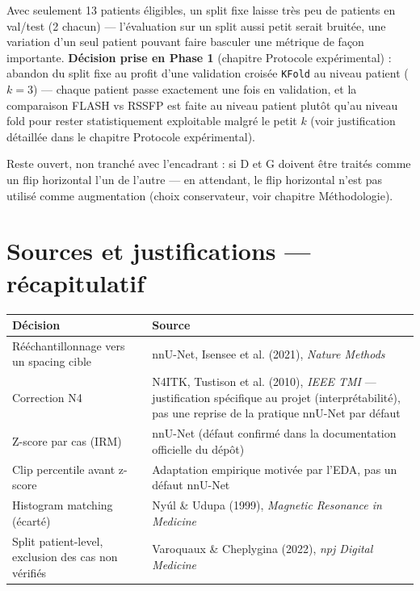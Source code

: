 Avec seulement 13 patients éligibles, un split fixe laisse très peu de patients en
val/test (2 chacun) --- l'évaluation sur un split aussi petit serait bruitée, une
variation d'un seul patient pouvant faire basculer une métrique de façon importante.
\textbf{Décision prise en Phase 1} (chapitre Protocole expérimental) : abandon du
split fixe au profit d'une validation croisée \texttt{KFold} au niveau patient
($k=3$) --- chaque patient passe exactement une fois en validation, et la comparaison
FLASH vs RSSFP est faite au niveau patient plutôt qu'au niveau fold pour rester
statistiquement exploitable malgré le petit $k$ (voir justification détaillée dans
le chapitre Protocole expérimental).

Reste ouvert, non tranché avec l'encadrant : si D et G doivent être traités comme un
flip horizontal l'un de l'autre --- en attendant, le flip horizontal n'est pas utilisé
comme augmentation (choix conservateur, voir chapitre Méthodologie).

\section{Sources et justifications --- récapitulatif}

\begin{center}
\begin{tabular}{lp{9cm}}
\toprule
Décision & Source \\
\midrule
Rééchantillonnage vers un spacing cible & nnU-Net, Isensee et al. (2021), \emph{Nature Methods} \\
Correction N4 & N4ITK, Tustison et al. (2010), \emph{IEEE TMI} --- justification spécifique au projet (interprétabilité), pas une reprise de la pratique nnU-Net par défaut \\
Z-score par cas (IRM) & nnU-Net (défaut confirmé dans la documentation officielle du dépôt) \\
Clip percentile avant z-score & Adaptation empirique motivée par l'EDA, pas un défaut nnU-Net \\
Histogram matching (écarté) & Nyúl \& Udupa (1999), \emph{Magnetic Resonance in Medicine} \\
Split patient-level, exclusion des cas non vérifiés & Varoquaux \& Cheplygina (2022), \emph{npj Digital Medicine} \\
\bottomrule
\end{tabular}
\end{center}

